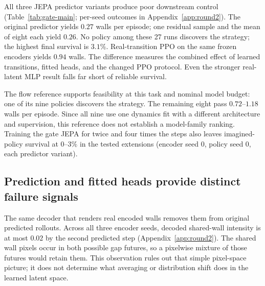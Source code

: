 All three JEPA predictor variants produce poor downstream control
(Table~\ref{tab:gate-main}; per-seed outcomes in Appendix~\ref{app:round2}). The original predictor yields $0.27$ walls
per episode; one residual sample and the mean of eight each yield $0.26$. No policy among these
27 runs discovers the strategy; the highest final survival is $3.1\%$. Real-transition PPO on the
same frozen encoders yields $0.94$ walls. The difference measures the combined effect of learned
transitions, fitted heads, and the changed PPO protocol. Even the stronger real-latent MLP result
falls far short of reliable survival.

The flow reference supports feasibility at this task and nominal model budget: one of its nine
policies discovers the strategy. The remaining eight pass $0.72$--$1.18$ walls per episode. Since
all nine use one dynamics fit with a different architecture and supervision, this reference does
not establish a model-family ranking. Training the gate JEPA for twice and four times the steps
also leaves imagined-policy survival at $0$--$3\%$ in the tested extensions (encoder seed 0, policy
seed 0, each predictor variant).

\begin{table}[t]
\centering
\caption{\textbf{Final gate outcomes, with predictor variants kept separate.} Mean $\pm$ sample
standard deviation across policy runs; discovery is final survival above $50\%$. JEPA imagination variants and real-latent
conditions each contain $3$ models $\times$ $3$ policies; pixel controls have three policies. Real training changes rewards, terminations, and PPO protocol
alongside dynamics. Flow is a single-model reference.}
\label{tab:gate-main}
\end{table}



\subsection{Prediction and fitted heads provide distinct failure signals}
\label{sec:results-mean}

The same decoder that renders real encoded walls removes them from original predicted rollouts.
Across all three encoder seeds, decoded shared-wall intensity is at most $0.02$ by the second
predicted step (Appendix~\ref{app:round2}). The shared wall pixels occur in both possible gap futures,
so a pixelwise mixture of those futures would retain them. This observation rules out that simple
pixel-space picture; it does not determine what averaging or distribution shift does in the learned
latent space.


